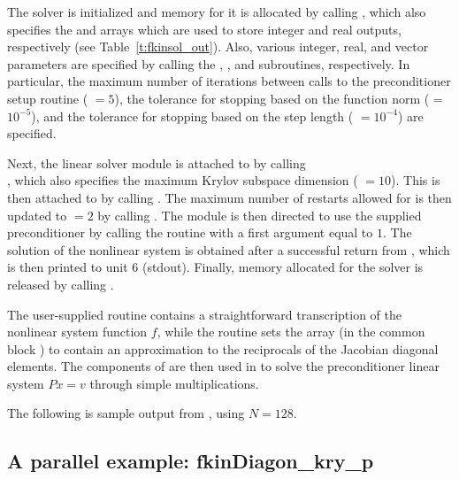 The {\kinsol} solver is initialized and memory for it is allocated by
calling , which also specifies the  and 
arrays which are used to store integer and real outputs, respectively
(see Table~\ref{t:fkinsol_out}). Also,
various integer, real, and vector parameters are specified by calling the
, , and  subroutines,
respectively. In particular, the maximum number of 
iterations between calls to the preconditioner setup routine ( $=5$),
the tolerance for stopping based on the function norm ( = $10^{-5}$),
and the tolerance for stopping based on the step length ( $=10^{-4}$)
are specified.

Next, the {\sunlinsolspgmr} linear solver module is attached to
{\kinsol} by calling \\ \noindent
{}, which also specifies the maximum Krylov subspace dimension
( $=10$).  This is then attached to {\kinsol} by calling
.  The maximum number of restarts allowed for {\spgmr}
is then updated to  $=2$ by calling
.  The {\sunlinsolspgmr} module is then directed
to use the supplied preconditioner by calling the  routine
with a first argument equal to $1$. The solution of the
nonlinear system is obtained after a successful return from , which
is then printed to unit 6 (stdout).
Finally, memory allocated for the {\kinsol} solver is released by
calling .

The user-supplied routine  contains a straightforward transcription
of the nonlinear system function $f$, while the routine  sets the
array  (in the common block ) to contain an approximation to 
the reciprocals of the Jacobian diagonal elements. The components of  are
then used in  to solve the preconditioner linear system $Px=v$
through simple multiplications.

The following is sample output from , using $N = 128$.



\subsection{A parallel example: fkinDiagon\_kry\_p}\label{ss:fkinDiagon_kry_p}

